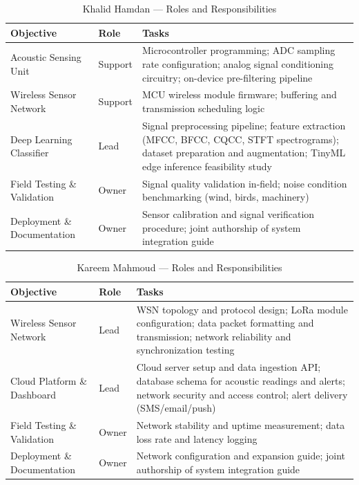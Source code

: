 \documentclass[12pt,a4paper,oneside]{memoir}
\begin{document}
\begin{table}[H]
\centering
\caption{Khalid Hamdan --- Roles and Responsibilities}
\label{tab:roles_khalid}
\renewcommand{\arraystretch}{1.3}
\begin{tabular}{>{\raggedright\arraybackslash}p{3.5cm} p{1.8cm} p{8.0cm}}
\toprule
\textbf{Objective} & \textbf{Role} & \textbf{Tasks} \\
\midrule
Acoustic Sensing Unit & Support & Microcontroller programming; ADC sampling rate
configuration; analog signal conditioning circuitry; on-device
pre-filtering pipeline \\
Wireless Sensor Network & Support & MCU wireless module firmware; buffering and transmission
scheduling logic \\
Deep Learning Classifier & Lead & Signal preprocessing pipeline; feature extraction (MFCC,
BFCC, CQCC, STFT spectrograms); dataset preparation and
augmentation; TinyML edge inference feasibility study \\
Field Testing \& Validation & Owner & Signal quality validation in-field; noise condition
benchmarking (wind, birds, machinery) \\
Deployment \& Documentation & Owner & Sensor calibration and signal verification procedure; joint
authorship of system integration guide \\
\bottomrule
\end{tabular}
\end{table}

\begin{table}[H]
\centering
\caption{Kareem Mahmoud --- Roles and Responsibilities}
\label{tab:roles_kareem}
\renewcommand{\arraystretch}{1.3}
\begin{tabular}{>{\raggedright\arraybackslash}p{3.5cm} p{1.8cm} >{\raggedright\arraybackslash}p{8.0cm}}
\toprule
\textbf{Objective} & \textbf{Role} & \textbf{Tasks} \\
\midrule
Wireless Sensor Network & Lead & WSN topology and protocol design; LoRa module
configuration; data packet formatting and transmission;
network reliability and synchronization testing \\
Cloud Platform \& Dashboard & Lead & Cloud server setup and data ingestion API; database schema
for acoustic readings and alerts; network security and access
control; alert delivery (SMS/email/push) \\
Field Testing \& Validation & Owner & Network stability and uptime measurement; data loss rate and
latency logging \\
Deployment \& Documentation & Owner & Network configuration and expansion guide; joint authorship
of system integration guide \\
\bottomrule
\end{tabular}
\end{table}
\end{document}
